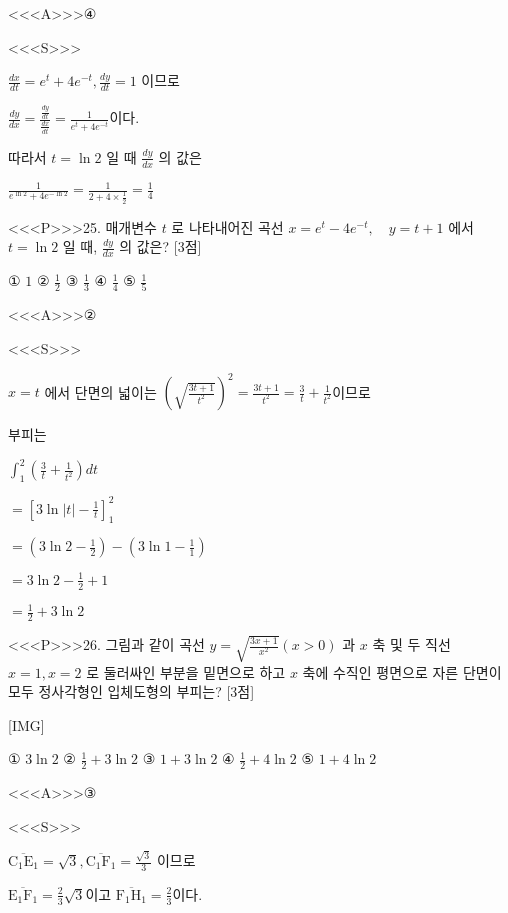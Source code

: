 \documentclass{oblivoir}
\begin{document}
<<<A>>>④

<<<S>>>



$ \frac{d x}{d t}=e^{t}+4 e^{-t}, \frac{d y}{d t}=1$ 이므로

$\frac{d y}{d x}=\frac{\frac{d y}{d t}}{\frac{d x}{d t}}=\frac{1}{e^{t}+4 e^{-t}}$이다.

따라서 $t=\ln 2$ 일 때 $\frac{d y}{d x}$ 의 값은

$\frac{1}{e^{\ln 2}+4 e^{-\ln 2}}=\frac{1}{2+4 \times \frac{1}{2}}=\frac{1}{4}
$


<<<P>>>25. 매개변수 $t$ 로 나타내어진 곡선
$ x=e^{t}-4 e^{-t}, \quad y=t+1 $
에서 $t=\ln 2$ 일 때, $\frac{d y}{d x}$ 의 값은? [3점]

① $1$
② $\frac{1}{2}$
③ $\frac{1}{3}$
④ $\frac{1}{4}$
⑤ $\frac{1}{5}$



<<<A>>>②

<<<S>>>



$x=t$ 에서 단면의 넓이는
$\left(\sqrt{\frac{3 t+1}{t^{2}}}\right)^{2}=\frac{3 t+1}{t^{2}}=\frac{3}{t}+\frac{1}{t^{2}}$이므로

부피는

$\int_{1}^{2}\left(\frac{3}{t}+\frac{1}{t^{2}}\right) d t $

$=\left[3 \ln |t|-\frac{1}{t}\right]_{1}^{2}$

$=\left(3 \ln 2-\frac{1}{2}\right)-\left(3 \ln 1-\frac{1}{1}\right)$

$=3 \ln 2-\frac{1}{2}+1$

$=\frac{1}{2}+3 \ln 2$


<<<P>>>26. 그림과 같이 곡선 $y=\sqrt{\frac{3 x+1}{x^{2}}}(x>0)$ 과 $x$ 축 및 두 직선 $x=1, x=2$ 로 둘러싸인 부분을 밑면으로 하고 $x$ 축에 수직인 평면으로 자른 단면이 모두 정사각형인 입체도형의 부피는? [3점]

[IMG]

① $3 \ln 2$
② $\frac{1}{2}+3 \ln 2$
③ $1+3 \ln 2$
④ $\frac{1}{2}+4 \ln 2$
⑤ $1+4 \ln 2$



<<<A>>>③

<<<S>>>



$\overline{\mathrm{C}_{1} \mathrm{E}_{1}}=\sqrt{3}, \overline{\mathrm{C}_{1} \mathrm{F}_{1}}=\frac{\sqrt{3}}{3}$ 이므로

$\overline{\mathrm{E}_{1} \mathrm{F}_{1}}=\frac{2}{3} \sqrt{3}$이고 $\overline{\mathrm{F}_{1} \mathrm{H}_{1}}=\frac{2}{3}$이다.
\end{document}
